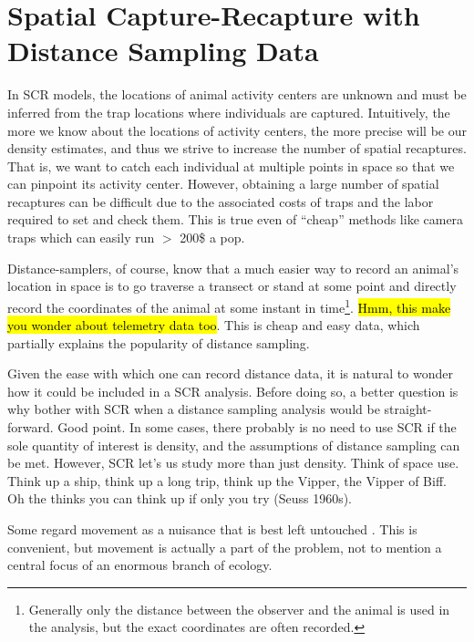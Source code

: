 


\chapter{Spatial Capture-Recapture with Distance Sampling Data}
\label{chapt.scrds}

\vspace{0.3cm}



In SCR models, the locations of animal activity
centers are unknown and must be inferred from the trap locations where
individuals are captured. Intuitively, the more
we know about the locations of activity centers, the more precise will
be our density estimates, and thus we strive to increase the
number of spatial recaptures. That is, we want to catch each
individual at multiple points in space so that we can pinpoint
its activity center. However, obtaining a large
number of spatial recaptures can be difficult due to the associated costs
of traps and the labor required to set and check them. This is true
even of ``cheap'' methods like camera traps which can easily run $>$
200\$ a pop.

Distance-samplers, of course, know that a much easier way to record an
animal's location in space is to go traverse a transect or stand at some
point and directly record the coordinates of the animal at some
instant in time\footnote{Generally only the distance between the
  observer and the animal is used in the analysis, but the exact
  coordinates are often recorded.}. \hl{Hmm, this make you wonder
  about telemetry data too}. This is cheap and easy data, which
partially explains the popularity of distance sampling.


Given the ease
with which one can record distance data, it is natural to wonder how
it could be included in a SCR analysis. Before doing so, a better
question is why bother with SCR when a distance sampling analysis would
be straight-forward. Good point. In some cases, there probably is no
need to use SCR if the sole quantity of interest is density, and the
assumptions of distance sampling can be met. However, SCR let's us
study more than just density. Think of space use. Think up a ship,
think up a long trip, think up the Vipper, the Vipper of Biff. Oh the
thinks you can think up if only you try (Seuss 1960s).

Some regard movement as a nuisance that is
best left untouched \citep{borchers:2010}. This is
convenient, but movement is actually a part of the problem, not to
mention a central focus of an enormous
branch of ecology.

